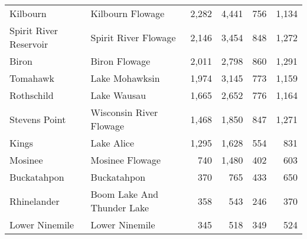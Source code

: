 \begin{table}[h!]
\begin{tabular}{llrrrr}
		Kilbourn                   & Kilbourn Flowage              & 2,282                                & 4,441                                & 756                        & 1,134                      \\
		Spirit River Reservoir     & Spirit River Flowage          & 2,146                                & 3,454                                & 848                        & 1,272                      \\
		Biron                      & Biron Flowage                 & 2,011                                & 2,798                                & 860                        & 1,291                      \\
		Tomahawk                   & Lake Mohawksin                & 1,974                                & 3,145                                & 773                        & 1,159                      \\
		Rothschild                 & Lake Wausau                   & 1,665                                & 2,652                                & 776                        & 1,164                      \\
		Stevens Point              & Wisconsin River Flowage       & 1,468                                & 1,850                                & 847                        & 1,271                      \\
		Kings                      & Lake Alice                    & 1,295                                & 1,628                                & 554                        & 831                        \\
		Mosinee                    & Mosinee Flowage               & 740                                  & 1,480                                & 402                        & 603                        \\
		Buckatahpon                & Buckatahpon                   & 370                                  & 765                                  & 433                        & 650                        \\
		Rhinelander                & Boom Lake And Thunder Lake    & 358                                  & 543                                  & 246                        & 370                        \\
		Lower Ninemile             & Lower Ninemile                & 345                                  & 518                                  & 349                        & 524                        \\

\end{tabular}
\end{table}
